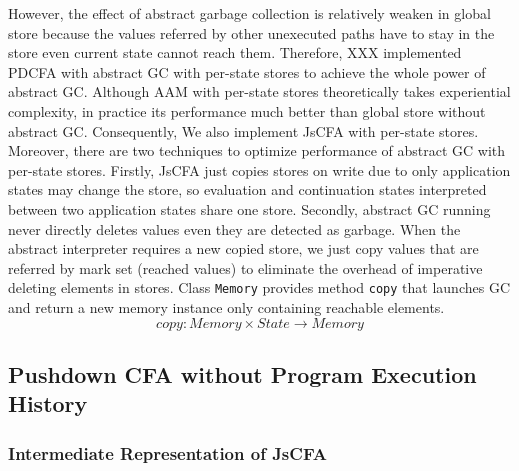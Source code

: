\documentclass{article}
\begin{document}
However, the effect of abstract garbage collection is relatively weaken in global store because the values referred by other unexecuted paths have to stay in the store even current state cannot reach them. Therefore, XXX implemented PDCFA with abstract GC with per-state stores to achieve the whole power of abstract GC\@. Although AAM with per-state stores theoretically takes experiential complexity, in practice its performance much better than global store without abstract GC\@.
Consequently, We also implement JsCFA with per-state stores. Moreover, there are two techniques to optimize performance of abstract GC with per-state stores. Firstly, JsCFA just copies stores on write due to only application states may change the store, so evaluation and continuation states interpreted between two application states share one store. Secondly, abstract GC running never directly deletes values even they are detected as garbage. When the abstract interpreter requires a new copied store, we just copy values that are referred by mark set (reached values) to eliminate the overhead of imperative deleting elements in stores.
Class \verb|Memory| provides method \verb|copy| that launches GC and return a new memory instance only containing reachable elements.
\[
copy: Memory \times State \to Memory
\]
\subsection{Pushdown CFA without Program Execution History}
\label{sub:pushdown-jscfa}
\subsubsection{Intermediate Representation of JsCFA}
\label{subs:Intermediate Representation of JsCFA}
\end{document}

